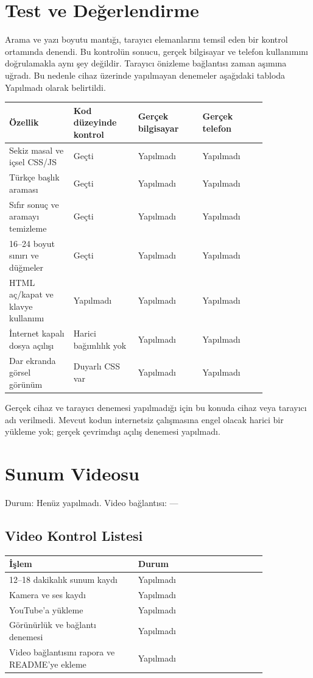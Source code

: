 \documentclass[11pt,a4paper]{article}
\begin{document}
\section{Test ve Değerlendirme}
Arama ve yazı boyutu mantığı, tarayıcı elemanlarını temsil eden bir kontrol ortamında denendi. Bu kontrolün sonucu, gerçek bilgisayar ve telefon kullanımını doğrulamakla aynı şey değildir. Tarayıcı önizleme bağlantısı zaman aşımına uğradı. Bu nedenle cihaz üzerinde yapılmayan denemeler aşağıdaki tabloda Yapılmadı olarak belirtildi.

\begin{longtable}{|p{0.21\linewidth}|p{0.21\linewidth}|p{0.21\linewidth}|p{0.21\linewidth}|}
\hline \textbf{Özellik} & \textbf{Kod düzeyinde kontrol} & \textbf{Gerçek bilgisayar} & \textbf{Gerçek telefon} \\ \hline\endhead
Sekiz masal ve içsel CSS/JS & Geçti & Yapılmadı & Yapılmadı \\ \hline
Türkçe başlık araması & Geçti & Yapılmadı & Yapılmadı \\ \hline
Sıfır sonuç ve aramayı temizleme & Geçti & Yapılmadı & Yapılmadı \\ \hline
16–24 boyut sınırı ve düğmeler & Geçti & Yapılmadı & Yapılmadı \\ \hline
HTML aç/kapat ve klavye kullanımı & Yapılmadı & Yapılmadı & Yapılmadı \\ \hline
İnternet kapalı dosya açılışı & Harici bağımlılık yok & Yapılmadı & Yapılmadı \\ \hline
Dar ekranda görsel görünüm & Duyarlı CSS var & Yapılmadı & Yapılmadı \\ \hline
\end{longtable}
Gerçek cihaz ve tarayıcı denemesi yapılmadığı için bu konuda cihaz veya tarayıcı adı verilmedi. Mevcut kodun internetsiz çalışmasına engel olacak harici bir yükleme yok; gerçek çevrimdışı açılış denemesi yapılmadı.

\section{Sunum Videosu}
Durum: Henüz yapılmadı. Video bağlantısı: —

\subsection{Video Kontrol Listesi}
\begin{longtable}{|p{0.42\linewidth}|p{0.42\linewidth}|}
\hline \textbf{İşlem} & \textbf{Durum} \\ \hline\endhead
12–18 dakikalık sunum kaydı & Yapılmadı \\ \hline
Kamera ve ses kaydı & Yapılmadı \\ \hline
YouTube’a yükleme & Yapılmadı \\ \hline
Görünürlük ve bağlantı denemesi & Yapılmadı \\ \hline
Video bağlantısını rapora ve README’ye ekleme & Yapılmadı \\ \hline
\end{longtable}
\newpage
\end{document}
